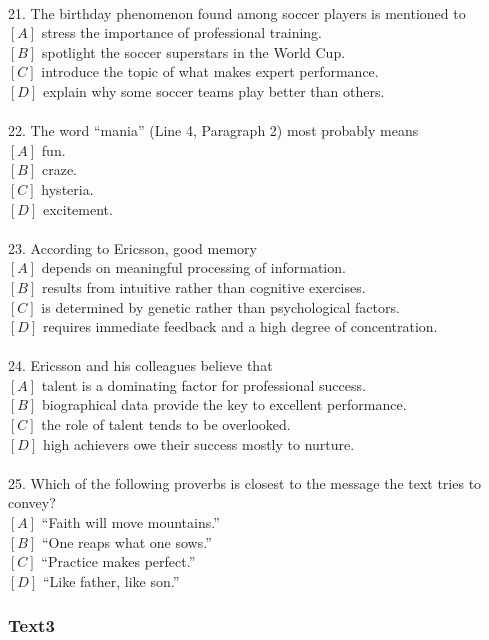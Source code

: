 \documentclass[a4paper]{article}
\begin{document}
\\21.	The birthday phenomenon found among soccer players is mentioned to\\$[A]$ stress the importance of professional training.\\$[B]$ spotlight the soccer superstars in the World Cup.\\$[C]$ introduce the topic of what makes expert performance.\\$[D]$ explain why some soccer teams play better than others.\\\\22.	The word “mania” (Line 4, Paragraph 2) most probably means\\$[A]$ fun.\\$[B]$ craze.\\$[C]$ hysteria.\\$[D]$ excitement.\\\\23.	According to Ericsson, good memory\\$[A]$ depends on meaningful processing of information.\\$[B]$ results from intuitive rather than cognitive exercises.\\$[C]$ is determined by genetic rather than psychological factors.\\$[D]$ requires immediate feedback and a high degree of concentration.\\\\24.	Ericsson and his colleagues believe that\\$[A]$ talent is a dominating factor for professional success.\\$[B]$ biographical data provide the key to excellent performance.\\$[C]$ the role of talent tends to be overlooked.\\$[D]$ high achievers owe their success mostly to nurture.\\\\25.	Which of the following proverbs is closest to the message the text tries to convey?\\$[A]$ “Faith will move mountains.”\\$[B]$ “One reaps what one sows.”\\$[C]$ “Practice makes perfect.”\\$[D]$ “Like father, like son.”\\\subsubsection{Text3}
\end{document}
